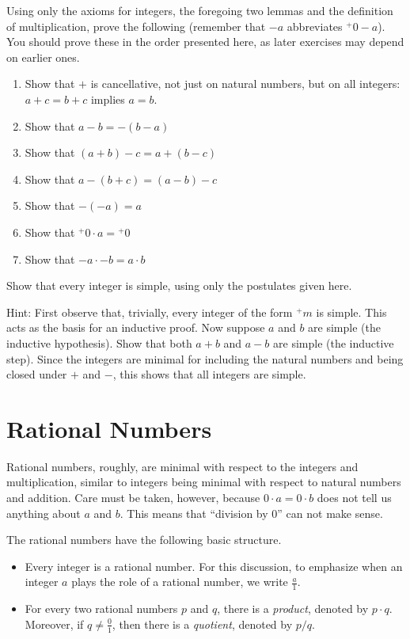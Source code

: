 \begin{exer}
	\begin{exercise}
\item Using only the axioms for integers, the foregoing two lemmas and the definition of multiplication, prove the following (remember
that $-a$ abbreviates ${}^+0 - a$). 
You should prove these in the order presented here, as later exercises may depend on earlier ones.
\begin{enumerate}
\item Show that $+$ is cancellative, not just on natural numbers, but on all integers: $a + c = b + c$ implies $a = b$.
\item Show that $a-b = -(b-a)$
\item Show that $(a+b) - c = a + (b-c)$
\item Show that $a-(b+c) = (a-b)-c$
\item Show that $-(-a) = a$
\item Show that ${}^+0\cdot a = {}^+0$
\item Show that $-a\cdot -b = a\cdot b$
\end{enumerate}
\item Show that every integer is simple, using only the postulates given here.

Hint: First observe that, trivially, every integer of the form ${}^+m$ is simple.
This acts as the basis for an inductive proof. 
Now suppose $a$ and $b$ are simple (the inductive hypothesis).
Show that both $a+b$ and $a-b$ are simple (the inductive step).
Since the integers are minimal for including the natural numbers and being closed under $+$ and $-$, this shows that all integers are simple.
\end{exercise}
\end{exer}

\section{Rational Numbers}

Rational numbers, roughly, are minimal with respect to the integers and multiplication, similar to 
integers being minimal with respect to natural numbers and addition. Care must be taken, however, because $0\cdot a = 0\cdot b$
does not tell us anything about $a$ and $b$. This means that ``division by $0$'' can not make sense.  

\begin{postulate}\label{post:RatSignature}
The rational numbers have the following basic structure.
\begin{itemize}
\item Every integer is a rational number. For this discussion, to emphasize when an integer $a$ plays the
role of a rational number, we write $\frac{a}{1}$. 
\item For every two rational numbers $p$ and $q$, there is a \emph{product}, denoted by $p\cdot q$.
Moreover, if $q\neq \frac{0}{1}$, then there is a \emph{quotient}, denoted by $p/q$.
\end{itemize}
\end{postulate}

